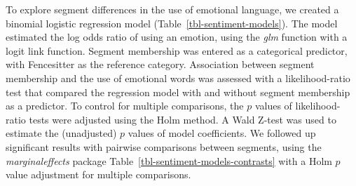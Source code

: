 \documentclass[
  letterpaper,
  DIV=11,
  numbers=noendperiod]{scrartcl}
\begin{document}
To explore segment differences in the use of emotional language, we
created a binomial logistic regression model
(Table~\ref{tbl-sentiment-models}). The model estimated the log odds
ratio of using an emotion, using the \emph{glm} function with a logit
link function. Segment membership was entered as a categorical
predictor, with Fencesitter as the reference category. Association
between segment membership and the use of emotional words was assessed
with a likelihood-ratio test that compared the regression model with and
without segment membership as a predictor. To control for multiple
comparisons, the \(p\) values of likelihood-ratio tests were adjusted
using the Holm \citeyearpar{holm1979} method. A Wald Z-test was used to
estimate the (unadjusted) \(p\) values of model coefficients. We
followed up significant results with pairwise comparisons between
segments, using the \emph{marginaleffects} package
\citep{R-marginaleffects} Table~\ref{tbl-sentiment-models-contrasts}
with a Holm \citeyearpar{holm1979} \(p\) value adjustment for multiple
comparisons.
\end{document}
